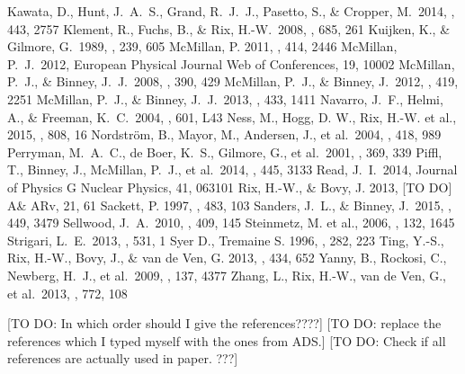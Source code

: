\documentclass[iop,revtex4]{emulateapj}
\begin{document}
\begin{thebibliography}{}
 Kawata, D., Hunt, J.~A.~S., Grand, R.~J.~J., Pasetto, S., \& Cropper, M.\ 2014, \mnras, 443, 2757 
 Klement, R., Fuchs, B., \& Rix, H.-W.\ 2008, \apj, 685, 261 
 Kuijken, K., \& Gilmore, G.\ 1989, \mnras, 239, 605 
 McMillan, P. 2011, \mnras, 414, 2446
 McMillan, P.~J.\ 2012, European Physical Journal Web of Conferences, 19, 10002 
 McMillan, P.~J., \& Binney, J.~J.\ 2008, \mnras, 390, 429 
 McMillan, P.~J., \& Binney, J.\ 2012, \mnras, 419, 2251 
 McMillan, P.~J., \& Binney, J.~J.\ 2013, \mnras, 433, 1411 
 Navarro, J.~F., Helmi, 
A., \& Freeman, K.~C.\ 2004, \apjl, 601, L43 
 Ness, M., Hogg, D. W., Rix, H.-W. et al., 2015, \apj, 808, 16
 Nordstr{\"o}m, B., Mayor, M., Andersen, J., et al.\ 2004, \aap, 418, 989 
 Perryman, M.~A.~C., de Boer, K.~S., Gilmore, G., et al.\ 2001, \aap, 369, 339 
 Piffl, T., Binney, J., McMillan, P.~J., et al.\ 2014, \mnras, 445, 3133
 Read, J.~I.\ 2014, Journal of Physics G Nuclear Physics, 41, 063101 
 Rix, H.-W., \& Bovy, J. 2013, [TO DO] A\& ARv, 21, 61
 Sackett, P. 1997, \apj, 483, 103
 Sanders, J.~L., \& Binney, J.\ 2015, \mnras, 449, 3479
 Sellwood, J.~A.\ 2010, \mnras, 409, 145 
 Steinmetz, M. et al., 2006, \aj, 132, 1645
 Strigari, L.~E.\ 2013, \physrep, 531, 1 
 Syer D., Tremaine S. 1996, \mnras, 282, 223
 Ting, Y.-S., Rix, H.-W., Bovy, J., \& van de Ven, G. 2013, \mnras, 434, 652
 Yanny, B., Rockosi, C., Newberg, H.~J., et al.\ 2009, \aj, 137, 4377 
 Zhang, L., Rix, H.-W., van de Ven, G., et al.\ 2013, \apj, 772, 108
\end{thebibliography}
[TO DO: In which order should I give the references????] [TO DO: replace the references which I typed myself with the ones from ADS.]
[TO DO: Check if all references are actually used in paper. ???]
%
\end{document}
